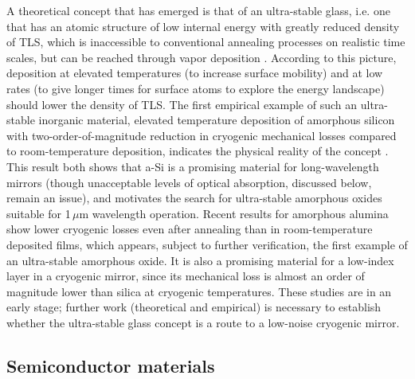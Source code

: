A theoretical concept that has emerged is that of an ultra-stable glass, i.e. one that has an atomic structure of low internal energy with greatly reduced density of TLS, which is inaccessible to conventional annealing processes on realistic time scales, but can be reached through vapor deposition \cite{singh2013ultrastable}. According to this picture, deposition at elevated temperatures (to increase surface mobility) and at low rates (to give longer times for surface atoms to explore the energy landscape) should lower the density of TLS. The first empirical example of such an ultra-stable inorganic material, elevated temperature deposition of amorphous silicon with two-order-of-magnitude reduction in cryogenic mechanical losses compared to room-temperature deposition, indicates the physical reality of the concept \cite{liu2014hydrogen}. This result both shows that a-Si is a promising material for long-wavelength mirrors (though unacceptable levels of optical absorption, discussed below, remain an issue), and motivates the search for ultra-stable amorphous oxides suitable for 1\,$\mu$m wavelength operation. Recent results for amorphous alumina show lower cryogenic losses even after annealing than in room-temperature deposited films, which appears, subject to further verification, the first example of an ultra-stable amorphous oxide. It is also a promising material for a low-index layer in a cryogenic mirror, since its mechanical loss is almost an order of magnitude lower than silica at cryogenic temperatures. These studies are in an early stage; further work (theoretical and empirical) is necessary to establish whether the ultra-stable glass concept is a route to a low-noise cryogenic mirror.  

\subsection{Semiconductor materials}

